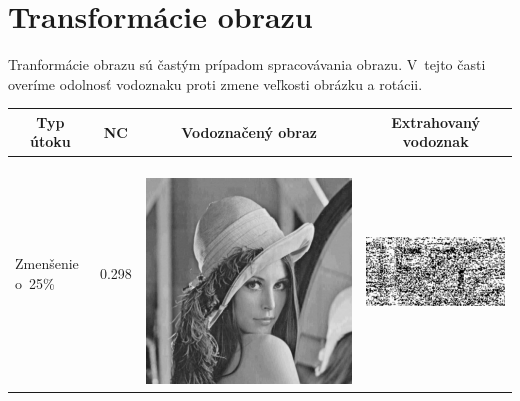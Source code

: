 \section{Transformácie obrazu} \label{transform}
Tranformácie obrazu sú častým prípadom spracovávania obrazu. V~tejto časti overíme odolnosť vodoznaku proti zmene veľkosti obrázku a rotácii.
\begin{table}[h]
\centering
\label{transform-table}
\begin{tabular}{llcc}
\hline
\multicolumn{1}{c}{\textbf{Typ útoku}} & \multicolumn{1}{c}{\textbf{NC}} & \multicolumn{1}{c}{\textbf{Vodoznačený obraz}} & \multicolumn{1}{c}{\textbf{Extrahovaný vodoznak}} \\ \hline
Zmenšenie o~25\%                       & 0.298 & 
\begin{minipage}[c]{.1\textwidth}
\ 
  \includegraphics[scale=0.1]{obrazky/scale75}
\end{minipage}
 &
 \begin{minipage}[c]{.15\textwidth}
   \includegraphics[scale=0.25]{obrazky/scale75-wm}

\end{minipage}
\end{tabular}
\end{table}
